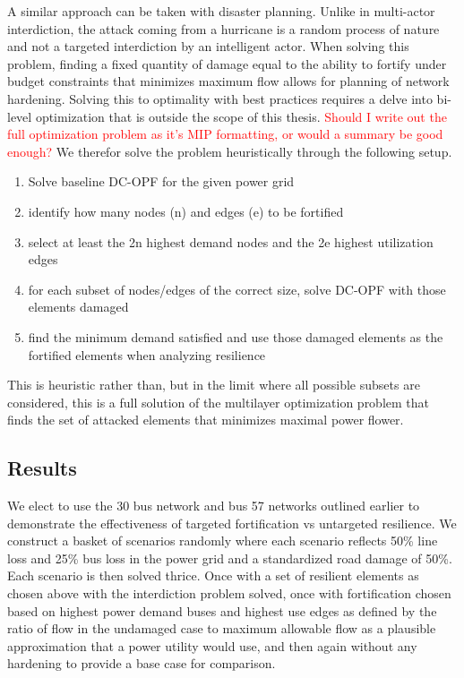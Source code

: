 \documentclass{article}
\begin{document}
	A similar approach can be taken with disaster planning. Unlike in multi-actor interdiction, the attack coming from a hurricane is a random process of nature and not a targeted interdiction by an intelligent actor. When solving this problem, finding a fixed quantity of damage equal to the ability to fortify under budget constraints that minimizes maximum flow allows for planning of network hardening. Solving this to optimality with best practices requires a delve into bi-level optimization that is outside the scope of this thesis. \textcolor{red}{Should I write out the full optimization problem as it's MIP formatting, or would a summary be good enough?} We therefor solve the problem heuristically through the following setup.
	
	\begin{enumerate}
		
	\item Solve baseline DC-OPF for the given power grid
	\item identify how many nodes (n) and edges (e) to be fortified
	\item select at least the 2n highest demand nodes and the 2e highest utilization edges
	\item for each subset of nodes/edges of the correct size, solve DC-OPF with those elements damaged
	\item find the minimum demand satisfied and use those damaged elements as the fortified elements when analyzing resilience 
	\end{enumerate}

	This is heuristic rather than, but in the limit where all possible subsets are considered, this is a full solution of the multilayer optimization problem that finds the set of attacked elements that minimizes maximal power flower. 
	\subsection{Results}
	We elect to use the 30 bus network and bus 57 networks outlined earlier to demonstrate the effectiveness of targeted fortification vs untargeted resilience. We construct a basket of scenarios randomly where each scenario reflects 50\% line loss and 25\% bus loss in the power grid and a standardized road damage of 50\%. Each scenario is then solved thrice. Once with a set of resilient elements as chosen above with the interdiction problem solved, once with fortification chosen based on highest power demand buses and highest use edges as defined by the ratio of flow in the undamaged case to maximum allowable flow as a plausible approximation that a power utility would use, and then again without any hardening to provide a base case for comparison.
	
\end{document}
